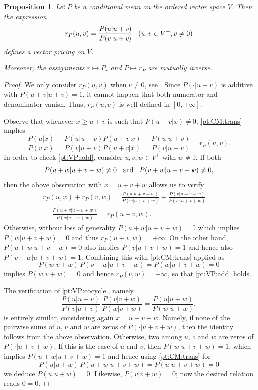 \documentclass[10pt,a4paper]{amsart}
\newtheorem{prop}{Proposition}
\begin{document}
\begin{prop}\label{prop:VP:CM:equiv}
Let $P$ be a conditional mean on the ordered vector space $V$. Then the expression
\begin{equation*}
r_P(u,v) = \frac{P(u|u+v)}{P(v|u+v)}\kern3mm (u,v\in V^+, v\neq 0)
\end{equation*}
defines a vector pricing on $V$.

Moreover, the assignments $r\mapsto P_r$ and $P\mapsto r_P$ are mutually inverse.
\end{prop}

\begin{proof}
We only consider $r_P(u,v)$ when $v\neq 0$, see . Since $P(\cdot| u+v)$ is additive with $P(u+v| u+v)=1$, it cannot happen that both numerator and denominator vanish. Thus, $r_P(u,v)$ is well-defined in $[0, +\infty]$.

Observe that whenever $x\geq u+v$ is such that $P(u+v|x) \neq 0$, \ref{pt:CM:trans} implies
\begin{equation*}
\frac{P(u|x)}{P(v|x)} = \frac{P(u|u+v) P(u+v|x)}{P(v|u+v) P(u+v|x)} = \frac{P(u|u+v)}{P(v|u+v)} =r_P(u,v).
\end{equation*}
In order to check \ref{pt:VP:add}, consider $u,v,w\in V^+$ with $w\neq 0$. If both
\begin{equation*}
P(u+w|u+v+w) \neq 0 \kern3mm \text{and} \kern3mm  P(v+w|u+v+w)\neq 0,
\end{equation*}
then the above observation with $x=u+v+w$ allows us to verify
\begin{multline*}
r_P(u, w) + r_P(v, w) = \frac{P(u|u+v+w)}{P(w|u+v+w)} +  \frac{P(v|u+v+w)}{P(w|u+v+w)} =  \\
= \frac{P(u+v|u+v+w)}{P(w|u+v+w)} = r_P(u+v, w).
\end{multline*}
Otherwise, without loss of generality $P(u+w|u+v+w)=0$ which implies $P(w|u+v+w)=0$ and thus $r_P(u+v, w)=+\infty$. On the other hand, $P(u+w|u+v+w)=0$ also implies $P(v|u+v+w)=1$ and hence also $P(v+w|u+v+w)=1$. Combining this with \ref{pt:CM:trans} applied as
\begin{equation*}
P(w|v+w) \, P(v+w|u+v+w) = P(w|u+v+w)=0
\end{equation*}
implies $P(w|v+w)=0$ and hence $r_P(v, w)=+\infty$, so that \ref{pt:VP:add} holds.

The verification of \ref{pt:VP:cocycle}, namely
\begin{equation*}
\frac{P(u|u+v)}{P(v|u+v)} \, \frac{P(v|v+w)}{P(w|v+w)} =\frac{P(u|u+w)}{P(w|u+w)},
\end{equation*}
is entirely similar, considering again $x=u+v+w$. Namely, if none of the pairwise sums of $u$, $v$ and $w$ are zeros of $P(\cdot|u+v+w)$, then the identity follows from the above observation. Otherwise, two among $u$, $v$ and $w$ are zeros of $P(\cdot|u+v+w)$. If this is the case of $u$  and $v$, then $P(w|u+v+w)=1$, which implies $P(u+w|u+v+w)=1$ and hence using \ref{pt:CM:trans} for
\begin{equation*}
P(u|u+w) \, P(u+w|u+v+w) = P(u|u+v+w)=0
\end{equation*}
we deduce $P(u|u+w)=0$. Likewise, $P(v|v+w)=0$; now the desired relation reads $0=0$. 


\end{proof}
\end{document}
